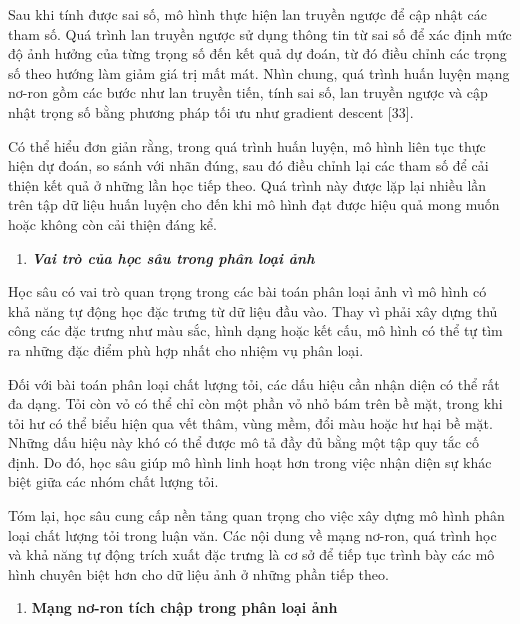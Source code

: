 \documentclass[
]{article}
\begin{document}
Sau khi tính được sai số, mô hình thực hiện lan truyền ngược để cập nhật
các tham số. Quá trình lan truyền ngược sử dụng thông tin từ sai số để
xác định mức độ ảnh hưởng của từng trọng số đến kết quả dự đoán, từ đó
điều chỉnh các trọng số theo hướng làm giảm giá trị mất mát. Nhìn chung,
quá trình huấn luyện mạng nơ-ron gồm các bước như lan truyền tiến, tính
sai số, lan truyền ngược và cập nhật trọng số bằng phương pháp tối ưu
như gradient descent {[}33{]}.

Có thể hiểu đơn giản rằng, trong quá trình huấn luyện, mô hình liên tục
thực hiện dự đoán, so sánh với nhãn đúng, sau đó điều chỉnh lại các tham
số để cải thiện kết quả ở những lần học tiếp theo. Quá trình này được
lặp lại nhiều lần trên tập dữ liệu huấn luyện cho đến khi mô hình đạt
được hiệu quả mong muốn hoặc không còn cải thiện đáng kể.

\begin{enumerate}
\def\labelenumi{\arabic{enumi}.}
\setcounter{enumi}{1}
\item
  \protect{}\label{_Toc232112003}{}\emph{\textbf{Vai trò
  của học sâu trong phân loại ảnh}}
\end{enumerate}

Học sâu có vai trò quan trọng trong các bài toán phân loại ảnh vì mô
hình có khả năng tự động học đặc trưng từ dữ liệu đầu vào. Thay vì phải
xây dựng thủ công các đặc trưng như màu sắc, hình dạng hoặc kết cấu, mô
hình có thể tự tìm ra những đặc điểm phù hợp nhất cho nhiệm vụ phân
loại.

Đối với bài toán phân loại chất lượng tỏi, các dấu hiệu cần nhận diện có
thể rất đa dạng. Tỏi còn vỏ có thể chỉ còn một phần vỏ nhỏ bám trên bề
mặt, trong khi tỏi hư có thể biểu hiện qua vết thâm, vùng mềm, đổi màu
hoặc hư hại bề mặt. Những dấu hiệu này khó có thể được mô tả đầy đủ bằng
một tập quy tắc cố định. Do đó, học sâu giúp mô hình linh hoạt hơn trong
việc nhận diện sự khác biệt giữa các nhóm chất lượng tỏi.

Tóm lại, học sâu cung cấp nền tảng quan trọng cho việc xây dựng mô hình
phân loại chất lượng tỏi trong luận văn. Các nội dung về mạng nơ-ron,
quá trình học và khả năng tự động trích xuất đặc trưng là cơ sở để tiếp
tục trình bày các mô hình chuyên biệt hơn cho dữ liệu ảnh ở những phần
tiếp theo.

\begin{enumerate}
\def\labelenumi{\arabic{enumi}.}
\setcounter{enumi}{3}
\item
  \protect{}\label{_Toc232112004}{}\textbf{Mạng nơ-ron tích
  chập trong phân loại ảnh}
\end{enumerate}
\end{document}
